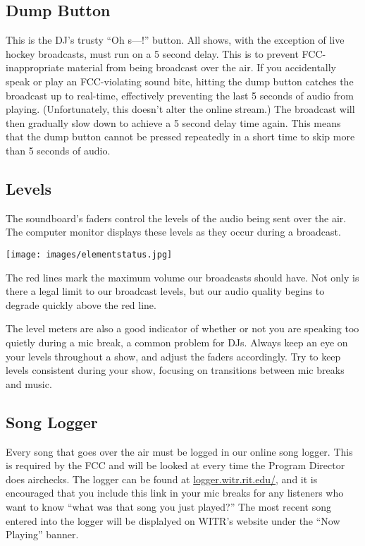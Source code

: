\documentclass{witrman}
\begin{document}
\subsection{Dump Button}

This is the DJ's trusty ``Oh s---!'' button.  All shows, with the exception of
live hockey broadcasts, must run on a 5 second delay.  This is to prevent
FCC-inappropriate material from being broadcast over the air.  If you
accidentally speak or play an FCC-violating sound bite, hitting the dump button
catches the broadcast up to real-time, effectively preventing the last 5 seconds
of audio from playing.  (Unfortunately, this doesn't alter the online stream.)
The broadcast will then gradually slow down to achieve a 5 second delay time
again.  This means that the dump button cannot be pressed repeatedly in a short
time to skip more than 5 seconds of audio.

\subsection{Levels}

The soundboard's faders control the levels of the audio being sent over the air.
The computer monitor displays these levels as they occur during a broadcast.

\texttt{[image: images/elementstatus.jpg]}

The red lines mark the maximum volume our broadcasts should have.  Not only is
there a legal limit to our broadcast levels, but our audio quality begins to
degrade quickly above the red line.

The level meters are also a good indicator of whether or not you are speaking
too quietly during a mic break, a common problem for DJs. Always keep an eye on
your levels throughout a show, and adjust the faders accordingly.  Try to keep
levels consistent during your show, focusing on transitions between mic breaks
and music.

\subsection{Song Logger}

Every song that goes over the air must be logged in our online song logger.
This is required by the FCC and will be looked at every time the Program
Director does airchecks.  The logger can be found at
\href{https://logger.witr.rit.edu}{logger.witr.rit.edu/}, and it is encouraged
that you include this link in your mic breaks for any listeners who want to know
``what was that song you just played?''  The most recent song entered into the
logger will be displalyed on WITR's website under the ``Now Playing'' banner.
\end{document}
